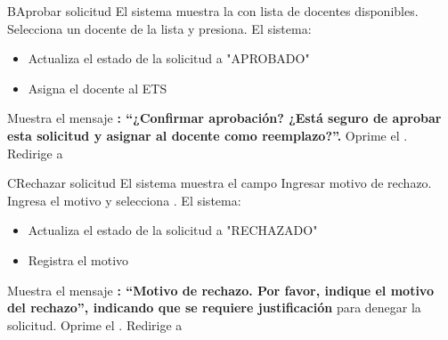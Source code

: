 \begin{UCtrayectoriaA}{B}{Aprobar solicitud}
	\UCpaso El sistema muestra la  con lista de docentes disponibles.
	\UCpaso[\UCactor] Selecciona un docente de la lista y presiona.
	\UCpaso El sistema:
	\begin{itemize}
		\item Actualiza el estado de la solicitud a "APROBADO"
		\item Asigna el docente al ETS
	\end{itemize}
	\UCpaso Muestra el mensaje \textbf{: ``¿Confirmar aprobación? ¿Está seguro de aprobar esta solicitud y asignar al docente como reemplazo?''.}
	\UCpaso[\UCactor] Oprime el .
	\UCpaso Redirige a 
\end{UCtrayectoriaA}
\begin{UCtrayectoriaA}{C}{Rechazar solicitud}
	\UCpaso El sistema muestra el campo Ingresar motivo de rechazo.
	\UCpaso[\UCactor] Ingresa el motivo y selecciona .
	\UCpaso El sistema:
	\begin{itemize}
		\item Actualiza el estado de la solicitud a "RECHAZADO"
		\item Registra el motivo
	\end{itemize}
	\UCpaso Muestra el mensaje \textbf{: ``Motivo de rechazo. Por favor, indique el motivo del rechazo'', indicando que se requiere justificación} para denegar la solicitud.
	\UCpaso[\UCactor] Oprime el .
	\UCpaso Redirige a 
\end{UCtrayectoriaA}

